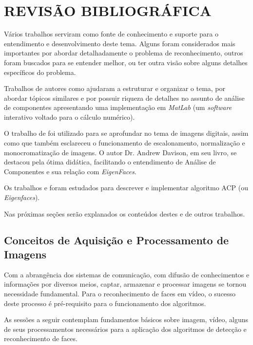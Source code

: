 
\chapter{REVISÃO BIBLIOGRÁFICA}\label{ch:rev-bibs}

Vários trabalhos serviram como fonte de conhecimento e suporte para o entendimento e desenvolvimento deste tema. Alguns foram considerados mais importantes por abordar detalhadamente o problema de reconhecimento, outros foram buscados para se entender melhor, ou ter outra visão sobre alguns detalhes específicos do problema.

Trabalhos de autores como  ajudaram a estruturar e organizar o tema, por abordar tópicos similares e por possuir riqueza de detalhes no assunto de análise de componentes apresentando uma implementação em \textit{MatLab} (um \textit{software} interativo voltado para o cálculo numérico).

O trabalho de  foi utilizado para se aprofundar no tema de imagens digitais, assim como   que também esclareceu o funcionamento de escalonamento, normalização e monocromatização de imagens. O autor Dr. Andrew Davison, em seu livro,  se destacou pela ótima didática, facilitando o entendimento de Análise de Componentes e sua relação com \textit{EigenFaces}. 

Os trabalhos  e  foram estudados para descrever e implementar algoritmo ACP (ou \textit{Eigenfaces}).

Nas próximas seções serão explanados os conteúdos destes e de outros trabalhos.


\section{Conceitos de Aquisição e Processamento de Imagens}\label{sec:processamento_imagens}

Com a abrangência dos sistemas de comunicação, com difusão de conhecimentos e informações por diversos meios, captar, armazenar e processar imagens se tornou necessidade fundamental. Para o reconhecimento de faces em vídeo, o sucesso deste processo é pré-requisito  para o funcionamento dos algoritmos. 

As sessões a seguir contemplam fundamentos básicos sobre imagem, vídeo, alguns de seus processamentos necessários para a aplicação dos algoritmos de detecção e reconhecimento de faces.


